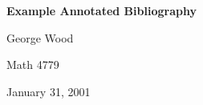 \documentclass[12pt]{article}
\begin{document}
\begin{center}
   {\Large\textbf{Example Annotated Bibliography}}
\medskip

   {\large   George Wood
\medskip

	Math 4779
\medskip

           January 31, 2001
   }
\end{center}
\nocite{*}



\end{document}
